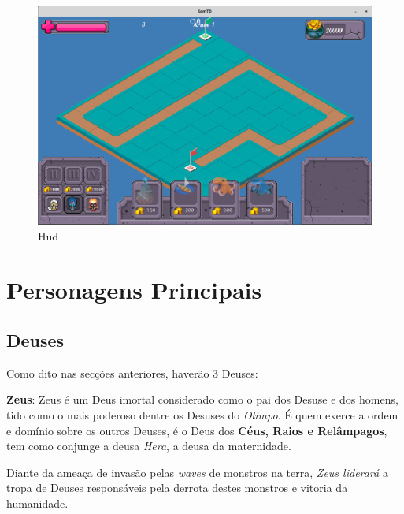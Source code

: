 \documentclass[11pt]{article} %
\begin{document}
\begin{figure}[!htp]
\centering
\includegraphics[scale=0.4]{res/gameplay2.png}
\caption{Hud}
\label{HUD}
\end{figure}

\newpage

\section{Personagens Principais}

\subsection{Deuses}
Como dito nas secções anteriores, haverão 3 Deuses:

{\large \textbf{Zeus}}: Zeus é um Deus imortal considerado como o pai dos Desuse e dos homens, tido como o mais poderoso dentre os Desuses do \textit{Olimpo}. É quem exerce a ordem e domínio sobre os outros Deuses, é o Deus dos \textbf{Céus, Raios e Relâmpagos}, tem como conjunge a deusa \textit{Hera}, a deusa da maternidade. 

Diante da ameaça de invasão pelas \textit{waves} de monstros na terra, \textit{Zeus liderará} a tropa de Deuses responsáveis pela derrota destes monstros e vitoria da humanidade. 
\end{document}
